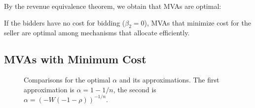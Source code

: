 By the revenue equivalence theorem,  we obtain that MVAs are optimal:

\begin{corollary}
If the bidders have no cost for bidding ($\beta_2=0$), MVAs 
that minimize cost for the seller
are optimal
among mechanisms that allocate efficiently.
\end{corollary}

\subsection{MVAs with Minimum Cost}
\label{sec:alpha-MVA}

\begin{figure}
\centering
  \caption{Comparisons for the optimal $\alpha$ and its approximations. The first
  approximation is $\alpha = 1-1/n$, the second is $\alpha =
  (-W(-1-\rho))^{-1/n}$.}
  \label{fig:alpha}
\end{figure}

